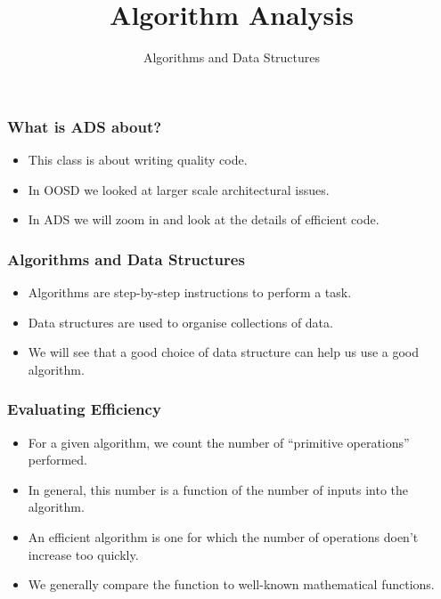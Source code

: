 \documentclass[10pt]{beamer}
\title{Algorithm Analysis}
\author[IN711]{Algorithms and Data Structures}
\institute[Otago Polytechnic]{
  Otago Polytechnic \\
  Dunedin, New Zealand \\
}
\date{}
\begin{document}
\begin{frame}[plain]
  \titlepage
\end{frame}


\begin{frame}
  \frametitle{What is ADS about?}

  \begin{itemize}
    \item This class is about writing quality code.
    \item In OOSD we looked at larger scale architectural issues.
    \item In ADS we will zoom in and look at the details of efficient 
          code.
  \end{itemize}
\end{frame}



\begin{frame}
	\frametitle{Algorithms and Data Structures}
	
	\begin{itemize}
		\item Algorithms are step-by-step instructions to perform a task.
		\item Data structures are used to organise collections of data.
		\item We will see that a good choice of data structure can help us use 
		      a good algorithm.
			
	\end{itemize}
\end{frame}


\begin{frame}
	\frametitle{Evaluating Efficiency }
	
	\begin{itemize}
		\item For a given algorithm, we count the number of ``primitive operations'' performed.
		\item In general, this number is a function of the number of inputs into the algorithm.
		\item An efficient algorithm is one for which the number of operations doen't increase too quickly.
		\item We generally compare the function to well-known mathematical functions. 
	\end{itemize}
\end{frame}
	
\end{document}
